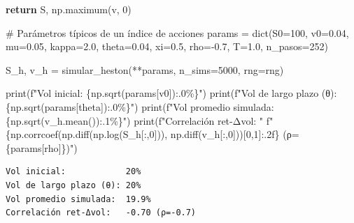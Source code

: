 \documentclass[
  spanish,
  letterpaper,
  DIV=11,
  numbers=noendperiod]{scrreprt}
\newenvironment{Shaded}{\begin{snugshade}}{\end{snugshade}}
\newcommand{\BuiltInTok}[1]{\textcolor[rgb]{0.00,0.23,0.31}{#1}}
\newcommand{\CommentTok}[1]{\textcolor[rgb]{0.37,0.37,0.37}{#1}}
\newcommand{\ControlFlowTok}[1]{\textcolor[rgb]{0.00,0.23,0.31}{\textbf{#1}}}
\newcommand{\DecValTok}[1]{\textcolor[rgb]{0.68,0.00,0.00}{#1}}
\newcommand{\FloatTok}[1]{\textcolor[rgb]{0.68,0.00,0.00}{#1}}
\newcommand{\NormalTok}[1]{\textcolor[rgb]{0.00,0.23,0.31}{#1}}
\newcommand{\OperatorTok}[1]{\textcolor[rgb]{0.37,0.37,0.37}{#1}}
\newcommand{\SpecialCharTok}[1]{\textcolor[rgb]{0.37,0.37,0.37}{#1}}
\newcommand{\SpecialStringTok}[1]{\textcolor[rgb]{0.13,0.47,0.30}{#1}}
\newcommand{\StringTok}[1]{\textcolor[rgb]{0.13,0.47,0.30}{#1}}
\begin{document}
\begin{Shaded}
\begin{Highlighting}[]
    \ControlFlowTok{return}\NormalTok{ S, np.maximum(v, }\DecValTok{0}\NormalTok{)}

\CommentTok{\# Parámetros típicos de un índice de acciones}
\NormalTok{params }\OperatorTok{=} \BuiltInTok{dict}\NormalTok{(S0}\OperatorTok{=}\DecValTok{100}\NormalTok{, v0}\OperatorTok{=}\FloatTok{0.04}\NormalTok{, mu}\OperatorTok{=}\FloatTok{0.05}\NormalTok{, kappa}\OperatorTok{=}\FloatTok{2.0}\NormalTok{, theta}\OperatorTok{=}\FloatTok{0.04}\NormalTok{,}
\NormalTok{              xi}\OperatorTok{=}\FloatTok{0.5}\NormalTok{, rho}\OperatorTok{={-}}\FloatTok{0.7}\NormalTok{, T}\OperatorTok{=}\FloatTok{1.0}\NormalTok{, n\_pasos}\OperatorTok{=}\DecValTok{252}\NormalTok{)}

\NormalTok{S\_h, v\_h }\OperatorTok{=}\NormalTok{ simular\_heston(}\OperatorTok{**}\NormalTok{params, n\_sims}\OperatorTok{=}\DecValTok{5000}\NormalTok{, rng}\OperatorTok{=}\NormalTok{rng)}

\BuiltInTok{print}\NormalTok{(}\SpecialStringTok{f"Vol inicial:            }\SpecialCharTok{\{}\NormalTok{np}\SpecialCharTok{.}\NormalTok{sqrt(params[}\StringTok{\textquotesingle{}v0\textquotesingle{}}\NormalTok{])}\SpecialCharTok{:.0\%\}}\SpecialStringTok{"}\NormalTok{)}
\BuiltInTok{print}\NormalTok{(}\SpecialStringTok{f"Vol de largo plazo (θ): }\SpecialCharTok{\{}\NormalTok{np}\SpecialCharTok{.}\NormalTok{sqrt(params[}\StringTok{\textquotesingle{}theta\textquotesingle{}}\NormalTok{])}\SpecialCharTok{:.0\%\}}\SpecialStringTok{"}\NormalTok{)}
\BuiltInTok{print}\NormalTok{(}\SpecialStringTok{f"Vol promedio simulada:  }\SpecialCharTok{\{}\NormalTok{np}\SpecialCharTok{.}\NormalTok{sqrt(v\_h.mean())}\SpecialCharTok{:.1\%\}}\SpecialStringTok{"}\NormalTok{)}
\BuiltInTok{print}\NormalTok{(}\SpecialStringTok{f"Correlación ret{-}Δvol:   "}
      \SpecialStringTok{f"}\SpecialCharTok{\{}\NormalTok{np}\SpecialCharTok{.}\NormalTok{corrcoef(np.diff(np.log(S\_h[:,}\DecValTok{0}\NormalTok{])), np.diff(v\_h[:,}\DecValTok{0}\NormalTok{]))[}\DecValTok{0}\NormalTok{,}\DecValTok{1}\NormalTok{]}\SpecialCharTok{:.2f\}}\SpecialStringTok{ (ρ=}\SpecialCharTok{\{}\NormalTok{params[}\StringTok{\textquotesingle{}rho\textquotesingle{}}\NormalTok{]}\SpecialCharTok{\}}\SpecialStringTok{)"}\NormalTok{)}
\end{Highlighting}
\end{Shaded}

\begin{verbatim}
Vol inicial:            20%
Vol de largo plazo (θ): 20%
Vol promedio simulada:  19.9%
Correlación ret-Δvol:   -0.70 (ρ=-0.7)
\end{verbatim}
\end{document}
